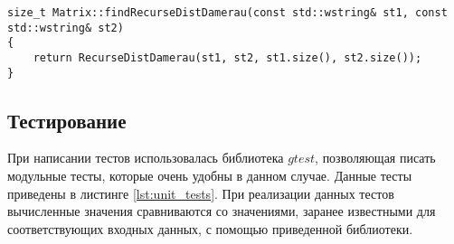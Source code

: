 \begin{lstlisting}[label=lst:damer_rec_meth, caption=Метод нахождения расстояния Дамерау-Левенштейна с использованием функции \ref{lst:damer_rec}]
size_t Matrix::findRecurseDistDamerau(const std::wstring& st1, const std::wstring& st2)
{
	return RecurseDistDamerau(st1, st2, st1.size(), st2.size());
}
\end{lstlisting}

\subsection{Тестирование}
При написании тестов использовалась библиотека $gtest$, позволяющая писать модульные тесты, которые очень удобны 
в данном случае. Данные тесты приведены в листинге  \ref{lst:unit_tests}. При реализации данных тестов вычисленные значения
сравниваются со значениями, заранее известными для соответствующих входных данных, с помощью приведенной библиотеки.
